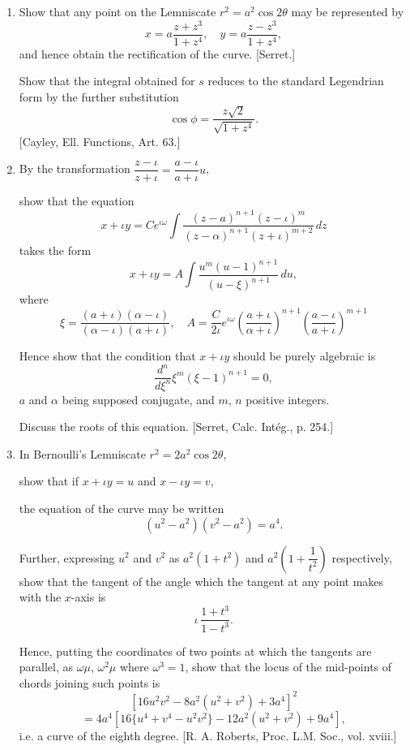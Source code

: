\documentclass[11pt, a4paper]{article}
\newcommand{\source}[1]{\hfill\textnormal{[#1]}}
\begin{document}
\begin{enumerate}[leftmargin=2em]

\item Show that any point on the Lemniscate $r^2=a^2\cos2\theta$ may be represented by
\[
x=a\frac{z+z^3}{1+z^4},\quad y=a\frac{z-z^3}{1+z^4},
\]
and hence obtain the rectification of the curve. \source{Serret.}

Show that the integral obtained for $s$ reduces to the standard Legendrian form by the further substitution
\[
\cos\phi=\frac{z\sqrt2}{\sqrt{1+z^4}}.
\]
\source{Cayley, Ell. Functions, Art. 63.}

\item By the transformation $\dfrac{z-\iota}{z+\iota}=\dfrac{a-\iota}{a+\iota}u$,

show that the equation
\[
x+\iota y=Ce^{\iota\omega}\int\frac{(z-a)^{n+1}(z-\iota)^m}{(z-\alpha)^{n+1}(z+\iota)^{m+2}}\,dz
\]
takes the form
\[
x+\iota y=A\int\frac{u^m(u-1)^{n+1}}{(u-\xi)^{n+1}}\,du,
\]
where
\[
\xi=\frac{(a+\iota)(\alpha-\iota)}{(\alpha-\iota)(a+\iota)},\quad A=\frac{C}{2\iota}e^{\iota\omega}\left(\frac{a+\iota}{\alpha+\iota}\right)^{n+1}\left(\frac{a-\iota}{a+\iota}\right)^{m+1}
\]

Hence show that the condition that $x+\iota y$ should be purely algebraic is
\[
\frac{d^n}{d\xi^n}\xi^m(\xi-1)^{n+1}=0,
\]
$a$ and $\alpha$ being supposed conjugate, and $m$, $n$ positive integers.

Discuss the roots of this equation. \source{Serret, Calc. Intég., p. 254.}

\item In Bernoulli's Lemniscate $r^2=2a^2\cos2\theta$,

show that if $x+\iota y=u$ and $x-\iota y=v$,

the equation of the curve may be written
\[
(u^2-a^2)(v^2-a^2)=a^4.
\]

Further, expressing $u^2$ and $v^2$ as $a^2(1+t^2)$ and $a^2\left(1+\dfrac{1}{t^2}\right)$ respectively, show that the tangent of the angle which the tangent at any point makes with the $x$-axis is
\[
\iota\,\frac{1+t^3}{1-t^3}.
\]

Hence, putting the coordinates of two points at which the tangents are parallel, as $\omega\mu$, $\omega^2\mu$ where $\omega^3=1$, show that the locus of the mid-points of chords joining such points is
\[
[16u^2v^2-8a^2(u^2+v^2)+3a^4]^2
\]
\[
=4a^4[16\{u^4+v^4-u^2v^2\}-12a^2(u^2+v^2)+9a^4],
\]
i.e. a curve of the eighth degree. \source{R. A. Roberts, Proc. L.M. Soc., vol. xviii.}


\end{enumerate}
\end{document}
